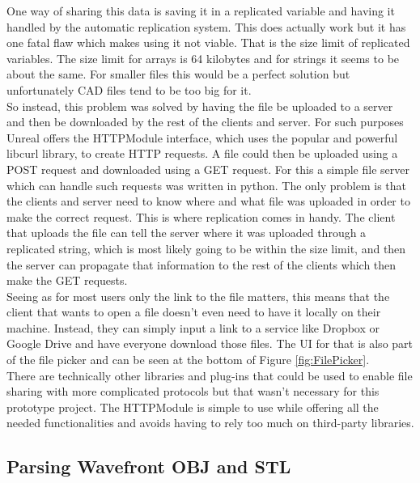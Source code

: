 One way of sharing this data is saving it in a replicated variable and having it handled by the automatic replication system. This does actually work but it has one fatal flaw which makes using it not viable. That is the size limit of replicated variables. The size limit for arrays is 64 kilobytes and for strings it seems to be about the same. For smaller files this would be a perfect solution but unfortunately \acs{CAD} files tend to be too big for it.\\
So instead, this problem was solved by having the file be uploaded to a server and then be downloaded by the rest of the clients and server. For such purposes Unreal offers the HTTPModule interface, which uses the popular and powerful libcurl library, to create \acs{HTTP} requests\cite{bib:UELibC}. A file could then be uploaded using a POST request and downloaded using a GET request. For this a simple file server which can handle such requests was written in python. The only problem is that the clients and server need to know where and what file was uploaded in order to make the correct request. This is where replication comes in handy. The client that uploads the file can tell the server where it was uploaded through a replicated string, which is most likely going to be within the size limit, and then the server can propagate that information to the rest of the clients which then make the GET requests.\\
Seeing as for most users only the link to the file matters, this means that the client that wants to open a file doesn't even need to have it locally on their machine. Instead, they can simply input a link to a service like Dropbox or Google Drive and have everyone download those files. The UI for that is also part of the file picker and can be seen at the bottom of Figure \ref{fig:FilePicker}.\\
There are technically other libraries and plug-ins that could be used to enable file sharing with more complicated protocols but that wasn't necessary for this prototype project. The HTTPModule is simple to use while offering all the needed functionalities and avoids having to rely too much on third-party libraries.
\subsection{Parsing Wavefront OBJ and STL}

